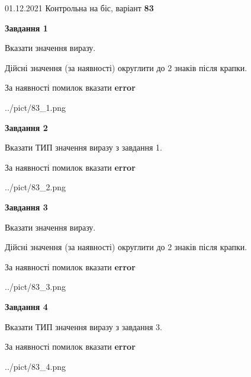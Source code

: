 \documentclass[11pt, ukrainian]{article}
\begin{document}
{01.12.2021 Контрольна на біс, варіант  \No \textbf { 83 }\par}
{
\begin {large}
{\begin {center}\textbf{Завдання 1}\end {center}}\par
Вказати значення виразу. \par
Дійсні значення (за наявності) округлити до 2 знаків після крапки. \par
За наявності помилок вказати \textbf{error}

\begin{center}
	{../pict/83_1.png}
\end{center}
\newpage

{\begin {center}\textbf{Завдання 2}\end {center}}\par
Вказати ТИП значення виразу з завдання 1. \par
За наявності помилок вказати \textbf{error}

\begin{center}
	{../pict/83_2.png}
\end{center}
\newpage

{\begin {center}\textbf{Завдання 3}\end {center}}\par
Вказати значення виразу. \par
Дійсні значення (за наявності) округлити до 2 знаків після крапки. \par
За наявності помилок вказати \textbf{error}

\begin{center}
	{../pict/83_3.png}
\end{center}
\newpage

{\begin {center}\textbf{Завдання 4}\end {center}}\par
Вказати ТИП значення виразу з завдання 3. \par
За наявності помилок вказати \textbf{error}

\begin{center}
	{../pict/83_4.png}
\end{center}
\newpage


\end{large}}
\end{document}

